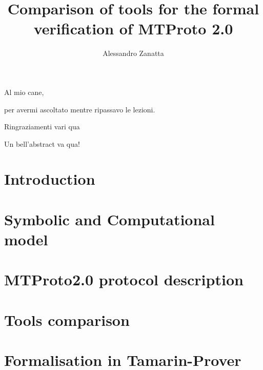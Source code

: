 \documentclass[target=bach,aauheader=]{thud}
\title{Comparison of tools for the formal verification of MTProto 2.0}
\author{Alessandro Zanatta}
\begin{document}
\maketitle

\begin{dedication}
	Al mio cane,\par per avermi ascoltato mentre ripassavo le lezioni.
\end{dedication}

\acknowledgements
Ringraziamenti vari qua

\abstract
Un bell'abstract va qua!

\tableofcontents



\mainmatter

\chapter{Introduction}


\chapter{Symbolic and Computational model}


\chapter{MTProto2.0 protocol description}


\chapter{Tools comparison}


\chapter{Formalisation in Tamarin-Prover}


\backmatter




\end{document}
